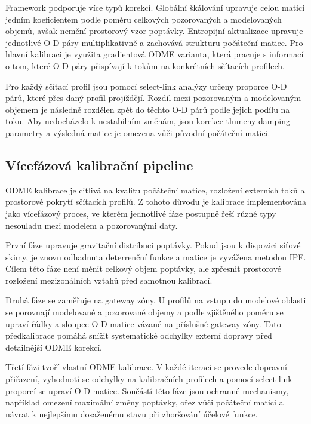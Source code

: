 Framework podporuje více typů korekcí. Globální škálování upravuje celou matici jedním koeficientem podle poměru celkových pozorovaných a modelovaných objemů, avšak nemění prostorový vzor poptávky. Entropijní aktualizace upravuje jednotlivé O-D páry multiplikativně a zachovává strukturu počáteční matice. Pro hlavní kalibraci je využita gradientová ODME varianta, která pracuje s informací o tom, které O-D páry přispívají k tokům na konkrétních sčítacích profilech.

Pro každý sčítací profil jsou pomocí select-link analýzy určeny proporce O-D párů, které přes daný profil projíždějí. Rozdíl mezi pozorovaným a modelovaným objemem je následně rozdělen zpět do těchto O-D párů podle jejich podílu na toku. Aby nedocházelo k nestabilním změnám, jsou korekce tlumeny damping parametry a výsledná matice je omezena vůči původní počáteční matici.

\subsection{Vícefázová kalibrační pipeline}
\label{sec:impl-calibration-multistage}

ODME kalibrace je citlivá na kvalitu počáteční matice, rozložení externích toků a prostorové pokrytí sčítacích profilů. Z tohoto důvodu je kalibrace implementována jako vícefázový proces, ve kterém jednotlivé fáze postupně řeší různé typy nesouladu mezi modelem a pozorovanými daty.

První fáze upravuje gravitační distribuci poptávky. Pokud jsou k dispozici síťové skimy, je znovu odhadnuta deterrenční funkce a matice je vyvážena metodou IPF. Cílem této fáze není měnit celkový objem poptávky, ale zpřesnit prostorové rozložení mezizonálních vztahů před samotnou kalibrací.

Druhá fáze se zaměřuje na gateway zóny. U profilů na vstupu do modelové oblasti se porovnají modelované a pozorované objemy a podle zjištěného poměru se upraví řádky a sloupce O-D matice vázané na příslušné gateway zóny. Tato předkalibrace pomáhá snížit systematické odchylky externí dopravy před detailnější ODME korekcí.

Třetí fázi tvoří vlastní ODME kalibrace. V každé iteraci se provede dopravní přiřazení, vyhodnotí se odchylky na kalibračních profilech a pomocí select-link proporcí se upraví O-D matice. Součástí této fáze jsou ochranné mechanismy, například omezení maximální změny poptávky, ořez vůči počáteční matici a návrat k nejlepšímu dosaženému stavu při zhoršování účelové funkce.


